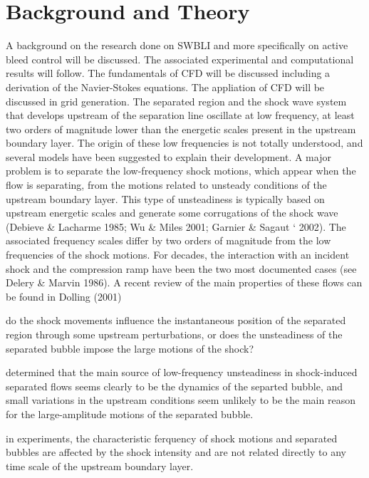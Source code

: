 \chapter{Background and Theory} \label{background and theory}

A background on the research done on SWBLI and more specifically on active bleed control will be discussed. The associated experimental and computational results will follow. The fundamentals of CFD will be discussed including a derivation of the Navier-Stokes equations. The appliation of CFD will be discussed in grid generation.
The separated region and the shock wave system that develops upstream of the separation line oscillate at low frequency, at least two orders of magnitude lower than the energetic scales present in the upstream boundary layer. The origin of these low frequencies is not totally understood, and several models have been suggested to explain their development. A major problem is to separate the low-frequency shock motions, which appear when the flow is separating, from the motions related to unsteady conditions of the upstream boundary layer. This type of unsteadiness is typically based on upstream energetic scales and generate some corrugations of the shock wave (Debieve \& Lacharme 1985; Wu \& Miles 2001; Garnier \& Sagaut ` 2002). The associated frequency scales differ by two orders of magnitude from the low frequencies of the shock motions. \cite{Piponniau2009}
For decades, the interaction with an incident shock and the compression ramp have been the two most documented cases (see Delery \& Marvin 1986). A recent review of the main properties of these flows can be found in Dolling (2001) \cite{Piponniau2009}

do the shock
movements influence the instantaneous position of the separated region through some
upstream perturbations, or does the unsteadiness of the separated bubble impose the
large motions of the shock?

determined that the main source of low-frequency unsteadiness in shock-induced separated flows seems clearly to be the dynamics of the separted bubble, and small variations in the upstream conditions seem unlikely to be the main reason for the large-amplitude motions of the separated bubble. 

in experiments, the characteristic ferquency of shock motions and separated bubbles are affected by the shock intensity and are not related directly to any time scale of the upstream boundary layer.

